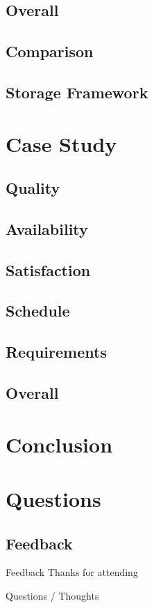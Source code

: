     \subsection{Overall}

    \subsection{Comparison}
    
    \subsection{Storage Framework}

\section{Case Study}
    \subsection{Quality}
    \subsection{Availability}
    \subsection{Satisfaction}
    \subsection{Schedule}
    \subsection{Requirements}
    \subsection{Overall}

\section{Conclusion}

\section{Questions}

\subsection{Feedback}
\begin{frame}
  {Feedback}
  \center 
  Thanks for attending
  
  Questions / Thoughts
  
\end{frame}
















